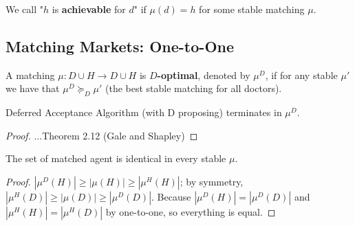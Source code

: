 \documentclass[11pt]{elegantbook}
\begin{document}
\begin{note}
    We call "$h$ is \textbf{achievable} for $d$" if $\mu(d)=h$ for some stable matching $\mu$.
\end{note}


\subsection{Matching Markets: One-to-One}
\begin{definition}
    \normalfont
    A matching $\mu: D\cup H \rightarrow D\cup H$ is \textbf{$D$-optimal}, denoted by $\mu^D$, if for any stable $\mu'$ we have that $\mu^D\succeq_D \mu'$ (the best stable matching for all doctors).
\end{definition}

\begin{theorem}
    Deferred Acceptance Algorithm (with D proposing) terminates in $\mu^D$.
\end{theorem}
\begin{proof}
    ...Theorem 2.12 (Gale and Shapley)
\end{proof}

\begin{theorem}
    The set of matched agent is identical in every stable $\mu$.
\end{theorem}
\begin{proof}
    $|\mu^D(H)|\geq |\mu(H)|\geq |\mu^H(H)|$; by symmetry, $|\mu^H(D)|\geq |\mu(D)|\geq |\mu^D(D)|$. Because $|\mu^D(H)|=|\mu^D(D)|$ and $|\mu^H(H)|=|\mu^H(D)|$ by one-to-one, so everything is equal.
\end{proof}
\end{document}
